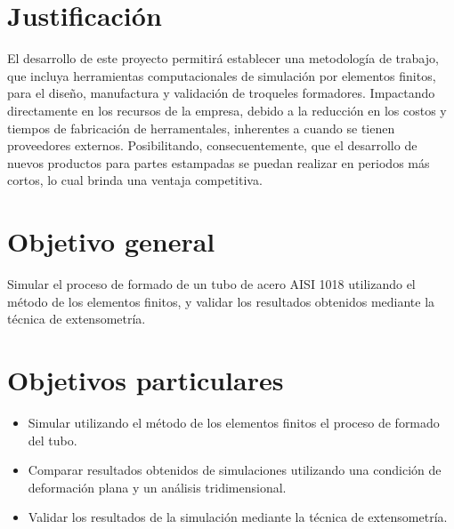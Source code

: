 \section{Justificación}

El desarrollo de este proyecto permitirá establecer una metodología de trabajo, que incluya herramientas computacionales 
de simulación por elementos finitos, para el diseño, manufactura y validación de troqueles formadores. Impactando directamente 
en los recursos de la empresa, debido a la reducción en los costos y tiempos de fabricación de herramentales, inherentes a cuando 
se tienen proveedores externos. Posibilitando, consecuentemente, que el desarrollo de nuevos productos para partes estampadas 
se puedan realizar en periodos más cortos, lo cual brinda una ventaja competitiva.



\section{Objetivo general}

Simular el proceso de formado de un tubo de acero AISI 1018 utilizando el método de los elementos finitos, 
y validar los resultados obtenidos mediante la técnica de extensometría.

\section{Objetivos particulares}
\begin{itemize}
\item Simular utilizando el método de los elementos finitos el proceso de formado del tubo.
\item Comparar resultados obtenidos de simulaciones utilizando una condición de deformación plana y un análisis tridimensional.
\item Validar los resultados de la simulación mediante la técnica de extensometría.
\end{itemize}


